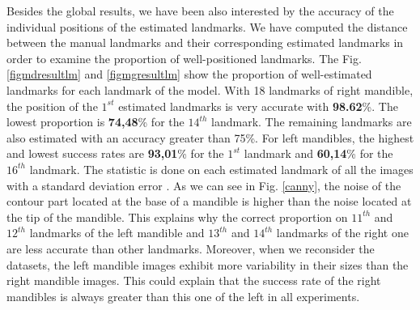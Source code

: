 \documentclass[twoside,twocolumn,10pt]{article}
\begin{document}
Besides the global results, we have been also interested by the accuracy of
the individual positions of the estimated landmarks.
We have computed the distance between the manual landmarks and their
corresponding estimated landmarks in order to examine the proportion
of well-positioned landmarks. The Fig. \ref{figmdresultlm} and
\ref{figmgresultlm} show the proportion of well-estimated landmarks
for each landmark of the model. With 18 landmarks of right mandible,
the position of the $1^{st}$ estimated landmarks is very accurate with
\textbf{98.62}\%. The lowest proportion is \textbf{74,48}\% for the
$14^{th}$ landmark. The remaining landmarks are also estimated with an
accuracy greater than 75\%. For left mandibles, the highest and lowest success rates are
\textbf{93,01}\% for the $1^{st}$ landmark and \textbf{60,14}\% for
the $16^{th}$ landmark. The statistic is done on each estimated
landmark of all the images with a standard deviation error
\cite{bland1996statistics}. As we can see in Fig. \ref{canny}, the
noise of the contour part located at the base of a mandible is higher
than the noise located at the tip of the mandible.
This explains why the correct proportion on $11^{th}$ and $12^{th}$
landmarks of the left mandible and $13^{th}$ and $14^{th}$ landmarks of
the right one are less accurate than other landmarks. Moreover,
when we reconsider the datasets, the left mandible images exhibit more variability in their sizes than the right mandible images. This could explain that the
success rate of the right mandibles is always greater than this one of the left
in all experiments.
\end{document}
